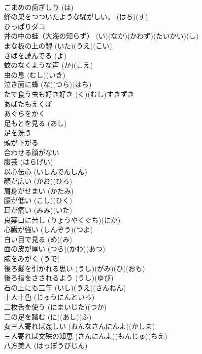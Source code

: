 \documentclass[8pt]{extreport}
\begin{document}
\begin{CJK}{UTF8}{min}
\\	ごまめの歯ぎしり		(は)	
\\	蜂の巣をつついたような騒がしい。		(はち)(す)	
\\	ひっぱりダコ			
\\	井の中の蛙（大海の知らず）		(い)(なか)(かわず)(たいかい)(し)	
\\	まな板の上の鯉		(いた)(うえ)(こい)	
\\	さばを読んでる		(よ)	
\\	蚊のなくような声		(か)(こえ)	
\\	虫の息		(むし)(いき)	
\\	泣き面に蜂		(な)(つら)(はち)	
\\	たで食う虫も好き好き		(く)(むし)すきずき	
\\	あばたもえくぼ			
\\	あぐらをかく			
\\	足もとを見る		(あし)	
\\	足を洗う			
\\	頭が下がる			
\\	合わせる顔がない			
\\	腹芸		(はらげい)	
\\	以心伝心		(いしんでんしん)	
\\	顔が広い		(かお)(ひろ)	
\\	肩身がせまい		(かたみ)	
\\	腰が低い		(こし)(ひく)	
\\	耳が痛い		(みみ)(いた)	
\\	良薬口に苦し		(りょうやくぐち)(にが)	
\\	心臓が強い		(しんぞう)(つよ)	
\\	白い目で見る		(め)(み)	
\\	面の皮が厚い		(つら)(かわ)(あつ)	
\\	腕をみがく		(うで)	
\\	後ろ髪を引かれる思い		(うし)(がみ)(ひ)(おも)	
\\	後ろ指をさされるよう		(うし)(ゆび)	
\\	石の上にも三年		(いし)(うえ)(さんねん)	
\\	十人十色		(じゅうにんといろ)	
\\	二枚舌を使う		(にまいじた)(つか)	
\\	二の足を踏む		(に)(あし)(ふ)	
\\	女三人寄れば姦しい		(おんなさんにんよ)(かしま)	
\\	三人寄れば文殊の知恵		(さんにんよ)(もんじゅ)(ちえ)	
\\	八方美人		(はっぽうびじん)	

\end{CJK}
\end{document}
